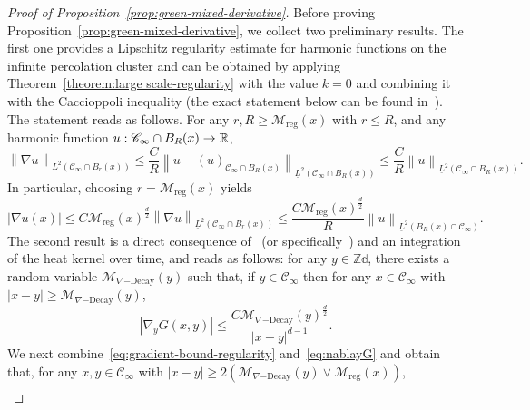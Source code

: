 \documentclass[12pt]{amsart}
\numberwithin{equation}{section}
\begin{document}
	
	\begin{proof}[Proof of Proposition~\ref{prop:green-mixed-derivative}]
		Before proving Proposition~\ref{prop:green-mixed-derivative}, we collect two preliminary results. The first one provides a Lipschitz regularity estimate for harmonic functions on the infinite percolation cluster and can be obtained by applying Theorem~\ref{theorem:large scale-regularity} with the value $k=0$ and combining it with the Caccioppoli inequality (the exact statement below can be found in~\cite[Proposition 2.14]{dario-corrector}). The statement reads as follows. For any $r , R \geq \mathcal{M}_{\mathrm{reg}}(x)$ with $r \leq R$, and any harmonic function $u : \mathscr{C}_\infty \cap B_R(x) \to \operatorname{\mathbb{R}}$,
		\begin{equation*}
			\left\| \nabla u \right\|_{\underline{L}^2(\mathscr{C}_\infty \cap B_r(x))} \leq \frac{C}{R} \left\|  u - (u)_{\mathscr{C}_\infty \cap B_R(x)} \right\|_{\underline{L}^2(\mathscr{C}_\infty \cap B_R(x))} \leq \frac{C}{R} \left\|  u \right\|_{\underline{L}^2(\mathscr{C}_\infty \cap B_R(x))}.
		\end{equation*}
		In particular, choosing $r = \mathcal{M}_{\mathrm{reg}}(x)$ yields
		\begin{equation} \label{eq:gradient-bound-regularity}
			| \nabla u(x) | \leq C \mathcal{M}_{\mathrm{reg}}(x)^{\frac{d}{2}} \left\| \nabla u \right\|_{\underline{L}^2(\mathscr{C}_\infty \cap B_r(x))}  \leq  \frac{C \mathcal{M}_{\mathrm{reg}}(x)^{\frac{d}{2}}}{R} \left\| u \right\|_{\underline{L}^2(B_R(x) \cap \mathscr{C}_{\infty})}.
		\end{equation}
		The second result is a direct consequence of~\cite[Theorem 3]{dario-gu-green} (or specifically~\cite[Remark 1.3]{dario-gu-green}) and an integration of the heat kernel over time, and reads as follows: for any $y \in \mathbb{Zd}$, there exists a random variable $\mathcal{M}_{\nabla\mathrm{-Decay}}(y)$ such that, if $y \in \mathscr{C}_\infty$ then for any $x \in \mathscr{C}_\infty$ with $|x - y| \geq \mathcal{M}_{\nabla\mathrm{-Decay}}(y)$,
		\begin{equation} \label{eq:nablayG}
			\left| \nabla_y G(x , y) \right| \leq \frac{C \mathcal{M}_{\nabla\mathrm{-Decay}}(y)^{\frac{d}{2}}}{|x - y|^{d-1}}.
		\end{equation}
		We next combine~\eqref{eq:gradient-bound-regularity} and~\eqref{eq:nablayG} and obtain that, for any $x , y \in \mathscr{C}_\infty$ with $|x - y| \geq 2 \left( \mathcal{M}_{\nabla\mathrm{-Decay}}(y) \vee \mathcal{M}_{\mathrm{reg}}(x) \right)$,
		\begin{align*}

\end{align*}
\end{proof}
\end{document}
